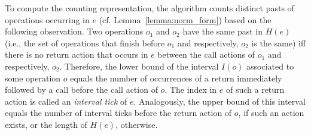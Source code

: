To compute the counting representation, the algorithm counts distinct pasts of operations occurring in $e$ (cf. Lemma~\ref{lemma:norm_form})
based on the following observation.
Two operations $o_1$ and $o_2$ have the same past in $H(e)$ 
(i.e., the set of operations that finish before $o_1$ and respectively, $o_2$ is the same) iff there is no return action that occurs in $e$ 
between the call actions of $o_1$ and respectively, $o_2$.
Therefore, the lower bound of the interval $I(o)$ associated to some operation $o$
equals the number of occurrences of a return immediately followed by a call before the call action of $o$.
The index in $e$ of such a return action is called an \emph{interval tick} of $e$.
Analogously, the upper bound of this interval equals the number of interval ticks before the return action of $o$,
if such an action exists,
or the length of $H(e)$, otherwise.


%
%
%
%

